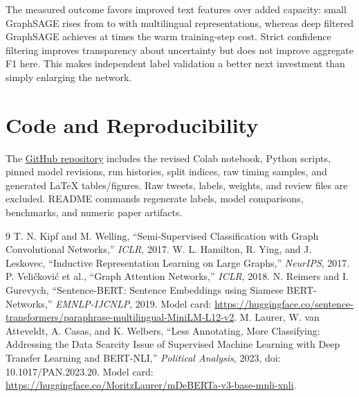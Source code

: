 \documentclass[conference]{IEEEtran}
\begin{document}
The measured outcome favors improved text features over added capacity: small GraphSAGE rises from \TFIDFFOne{} to \SmallFOne{} with multilingual representations, whereas deep filtered GraphSAGE achieves \LargeFOne{} at \LargeTimeRatio{} times the warm training-step cost. Strict confidence filtering improves transparency about uncertainty but does not improve aggregate F1 here. This makes independent label validation a better next investment than simply enlarging the network.

\section*{Code and Reproducibility}
The \href{https://github.com/VikiShmiki/Political-Misinformation-Social-Networks}{GitHub repository} includes the revised Colab notebook, Python scripts, pinned model revisions, run histories, split indices, raw timing samples, and generated LaTeX tables/figures. Raw tweets, labels, weights, and review files are excluded. README commands regenerate labels, model comparisons, benchmarks, and numeric paper artifacts.

\begin{thebibliography}{9}
 T. N. Kipf and M. Welling, ``Semi-Supervised Classification with Graph Convolutional Networks,'' \emph{ICLR}, 2017.
 W. L. Hamilton, R. Ying, and J. Leskovec, ``Inductive Representation Learning on Large Graphs,'' \emph{NeurIPS}, 2017.
 P. Veli\v{c}kovi\'c et al., ``Graph Attention Networks,'' \emph{ICLR}, 2018.
 N. Reimers and I. Gurevych, ``Sentence-BERT: Sentence Embeddings using Siamese BERT-Networks,'' \emph{EMNLP-IJCNLP}, 2019. Model card: \url{https://huggingface.co/sentence-transformers/paraphrase-multilingual-MiniLM-L12-v2}.
 M. Laurer, W. van Atteveldt, A. Casas, and K. Welbers, ``Less Annotating, More Classifying: Addressing the Data Scarcity Issue of Supervised Machine Learning with Deep Transfer Learning and BERT-NLI,'' \emph{Political Analysis}, 2023, doi: 10.1017/PAN.2023.20. Model card: \url{https://huggingface.co/MoritzLaurer/mDeBERTa-v3-base-mnli-xnli}.
\end{thebibliography}
\end{document}
